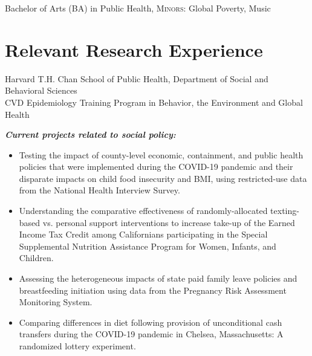 \documentclass{cv_style}
\begin{document}
\parskip -4pt \noindent  Bachelor of Arts (BA) in Public Health, \textsc{Minors:} Global Poverty, Music


\parskip -5pt 
\section{Relevant Research Experience}
\parskip -5pt
\parskip -4pt \noindent Harvard T.H. Chan School of Public Health, Department of Social and Behavioral Sciences \\
CVD Epidemiology Training Program in Behavior, the Environment and Global Health 

\vspace{1em}

\textit{\textbf{Current projects related to social policy:}}
\begin{itemize}
    \item Testing the impact of county-level economic, containment, and public health policies that were implemented during the COVID-19 pandemic and their disparate impacts on child food insecurity and BMI, using restricted-use data from the National Health Interview Survey. \parskip 1pt
    \item Understanding the comparative effectiveness of randomly-allocated texting-based vs. personal support interventions to increase take-up of the Earned Income Tax Credit among Californians participating in the Special Supplemental Nutrition Assistance Program for Women, Infants, and Children. \parskip 1pt
    \item Assessing the heterogeneous impacts of state paid family leave policies and breastfeeding initiation using data from the Pregnancy Risk Assessment Monitoring System. \parskip 1pt
    \item Comparing differences in diet following provision of unconditional cash transfers during the COVID-19 pandemic in Chelsea, Massachusetts: A randomized lottery experiment.
\end{itemize}
\end{document}
